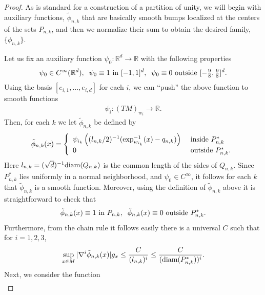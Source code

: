 \documentclass[11pt,reqno]{amsart}
\numberwithin{equation}{section}
\theoremstyle{plain}
\def\diam{\textnormal{diam}}
\begin{document}
  \begin{proof}
    As is standard for a construction of a partition of unity, we will begin with auxiliary functions, $\tilde \phi_{n,k}$ that are basically smooth bumps localized at the centers of the sets $P_{n,k}$, and then we normalize their sum to obtain the desired family, $\{\phi_{n,k}\}$.
    
    Let us fix an auxiliary function $\psi_0:\mathbb{R}^d\to\mathbb{R}$ with the following properties
    \begin{align*}	
      \psi_0 \in C^{\infty}(\mathbb{R}^d),\;\;\psi_0 \equiv 1 \textnormal{ in } [-1,1]^d,\;\;\psi_0 \equiv 0 \textnormal{ outside } [-\tfrac{9}{8},\tfrac{9}{8}]^d.	
    \end{align*}	
    Using the basis $[e_{i,1},\ldots,e_{i,d}]$ for each $i$, we can ``push''  the above function to smooth functions
    \begin{align*}	
      \psi_{i}:(TM)_{w_i} \to \mathbb{R}.		
    \end{align*}		
    Then, for each $k$ we let $\tilde \phi_{n,k}$ be defined by
    \begin{align*} 
      \tilde \phi_{n,k}(x) = \left \{ \begin{array}{ll}
	  \psi_{i_k} \left ( (l_{n,k}/2)^{-1}(\exp_{w_{i_k}}^{-1}(x)-q_{n,k})\right ) & \textnormal{ inside } P_{n,k}^*\\
	  0 & \textnormal{ outside } P_{n,k}^*.
	  \end{array}\right.
    \end{align*}
    Here $l_{n,k} = (\sqrt{d})^{-1}\diam(Q_{n,k})$ is the common length of the sides of $Q_{n,k}$. Since $P_{n,k}^*$ lies uniformly in a normal neighborhood, and $\psi_0 \in C^\infty$, it follows for each $k$ that $\tilde \phi_{n,k}$ is a smooth function. Moreover, using the definition of $\tilde \phi_{n,k}$ above it is straightforward to check that
    \begin{align*}		
      \tilde \phi_{n,k}(x) \equiv	1 \textnormal{ in } P_{n,k},\;\;\tilde \phi_{n,k}(x)\equiv 0 \textnormal{ outside } P_{n,k}^*.
    \end{align*}	
    Furthermore, from the chain rule it follows easily there is a universal $C$ such that for $i=1,2,3$,
    \begin{align*}	
      \sup \limits_{x\in M}|\nabla^i \tilde \phi_{n,k}(x)|g_{x} \leq \frac{C}{(l_{n,k})^i} \leq \frac{C}{(\diam(P_{n,k}^*))^i}. 
    \end{align*}
    Next, we consider the function
    \begin{align*}

\end{align*}
\end{proof}
\end{document}
